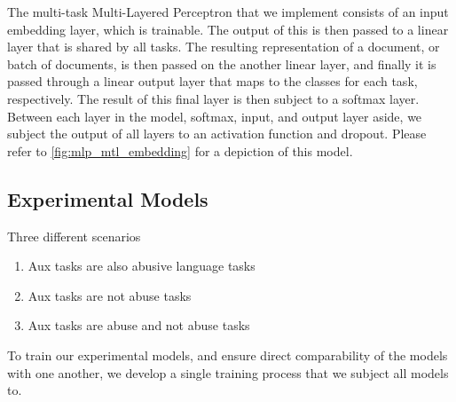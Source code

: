 The multi-task Multi-Layered Perceptron that we implement consists of an input embedding layer, which is trainable. The output of this is then passed to a linear layer that is shared by all tasks. The resulting representation of a document, or batch of documents, is then passed on the another linear layer, and finally it is passed through a linear output layer that maps to the classes for each task, respectively. The result of this final layer is then subject to a softmax layer. Between each layer in the model, softmax, input, and output layer aside, we subject the output of all layers to an activation function and dropout. Please refer to \autoref{fig:mlp_mtl_embedding} for a depiction of this model.



\subsection{Experimental Models}

Three different scenarios
\begin{enumerate}
  \item Aux tasks are also abusive language tasks
  \item Aux tasks are not abuse tasks
  \item Aux tasks are abuse and not abuse tasks
\end{enumerate}

To train our experimental models, and ensure direct comparability of the models with one another, we develop a single training process that we subject all models to.\vspace{5mm}

